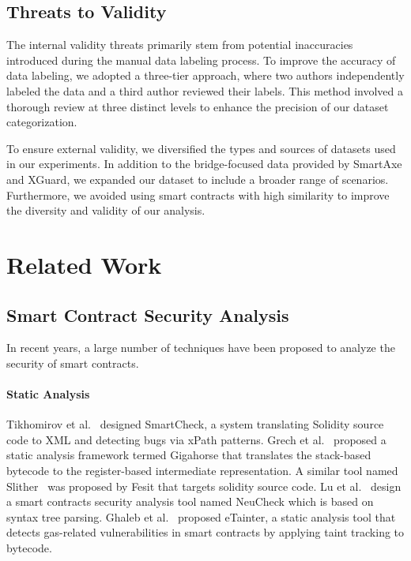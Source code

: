 \subsection{Threats to Validity}
The internal validity threats primarily stem from potential inaccuracies introduced during the manual data labeling process. To improve the accuracy of data labeling, we adopted a three-tier approach, where two authors independently labeled the data and a third author reviewed their labels. This method involved a thorough review at three distinct levels to enhance the precision of our dataset categorization.

To ensure external validity, we diversified the types and sources of datasets used in our experiments. In addition to the bridge-focused data provided by SmartAxe and XGuard, we expanded our dataset to include a broader range of scenarios. Furthermore, we avoided using smart contracts with high similarity to improve the diversity and validity of our analysis.


\section{Related Work}
\subsection{Smart Contract Security Analysis}
In recent years, a large number of techniques have been proposed to analyze the security of smart contracts.

\paragraph{Static Analysis}
Tikhomirov et al.~\cite{tikhomirov2018smartcheck} designed SmartCheck, a system translating
Solidity source code to XML and detecting bugs via xPath patterns. Grech et
al.~\cite{grech2022elipmoc} proposed a static analysis framework termed Gigahorse that translates
the stack-based bytecode to the register-based intermediate representation. A similar tool named
Slither~\cite{Slither} was proposed by Fesit that targets solidity source code. Lu et
al.~\cite{lu2021neucheck} design a smart contracts security analysis tool named NeuCheck which is
based on syntax tree parsing. Ghaleb et al.~\cite{ghaleb2022etainter} proposed eTainter, a static analysis tool that detects gas-related vulnerabilities in smart contracts by applying taint tracking to bytecode.

